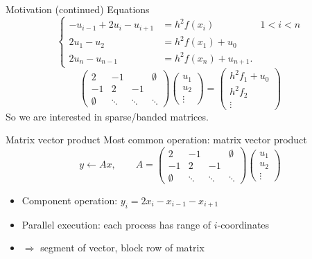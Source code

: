 \begin{numberedframe}{Motivation (continued)}
  Equations
  \[ \left\{
  \begin{array}{rll}
    -u_{i-1} + 2u_i - u_{i+1} &= h^2f(x_i)&1<i<n \\
    2u_1-u_2                  &=h^2f(x_1)+u_0\\
    2u_n-u_{n-1}              &=h^2f(x_{n})+u_{n+1}.
  \end{array}
  \right.
  \]
  \begin{equation}
    \begin{pmatrix}
      2&-1&&\emptyset\\ -1&2&-1\\ \emptyset&\ddots&\ddots&\ddots
    \end{pmatrix}
    \begin{pmatrix}
      u_1\\ u_2\\ \vdots
    \end{pmatrix}
    =
    \begin{pmatrix}
      h^2f_1+u_0\\ h^2f_2\\ \vdots
    \end{pmatrix}
    \label{eq:1d2nd-matrix-vector}
  \end{equation}
  So we are interested in sparse/banded matrices.
\end{numberedframe}

\begin{numberedframe}{Matrix vector product}
  Most common operation: matrix vector product
  \[ y\leftarrow Ax,\qquad
  A = \begin{pmatrix}
      2&-1& &\emptyset\\ -1&2&-1\\ \emptyset&\ddots&\ddots&\ddots
    \end{pmatrix}
    \begin{pmatrix}
      u_1\\ u_2\\ \vdots
    \end{pmatrix}
  \]
  \begin{itemize}
  \item Component operation: $y_i=2x_i-x_{i-1}-x_{i+1}$
  \item Parallel execution: each process has range of $i$-coordinates
  \item $\Rightarrow$ segment of vector, block row of matrix
  \end{itemize}  
\end{numberedframe}

